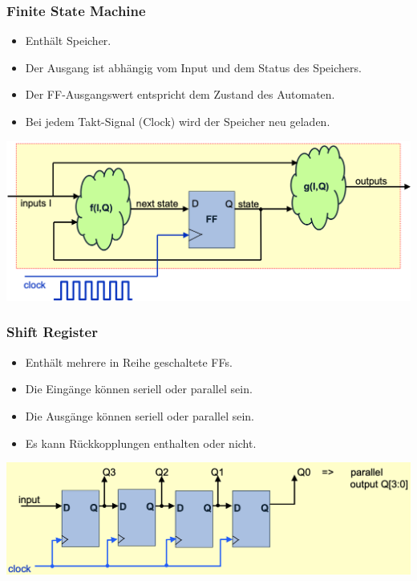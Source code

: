 \subsubsection{Finite State Machine}
\begin{itemize}
	\item Enthält Speicher.
	\item Der Ausgang ist abhängig vom Input und dem Status des Speichers.
	\item Der FF-Ausgangswert entspricht dem Zustand des Automaten.
	\item Bei jedem Takt-Signal (Clock) wird der Speicher neu geladen.
\end{itemize}
\begin{center}
	\includegraphics[width=1\linewidth]{images/FSM.png}
\end{center}
\subsubsection{Shift Register}
\begin{itemize}
	\item Enthält mehrere in Reihe geschaltete FFs.
	\item Die Eingänge können seriell oder parallel sein.
	\item Die Ausgänge können seriell oder parallel sein.
	\item Es kann Rückkopplungen enthalten oder nicht.
\end{itemize}
\begin{center}
	\includegraphics[width=1\linewidth]{images/shiftregister.png}
\end{center}


